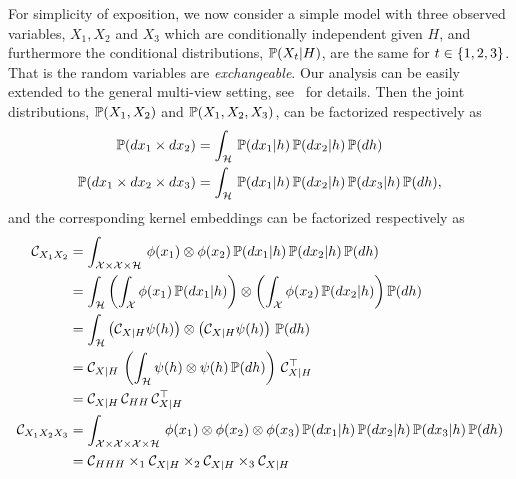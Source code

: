 \documentclass[11pt]{article}
\begin{document}
For simplicity of exposition, we now consider a simple model with three observed variables, $X_1, X_2$ and $X_3$ which are conditionally independent given $H$, and furthermore the conditional distributions, $\mathbb{P}(X_t|H)$, are the same for $t \in \left\{1,2,3\right\}$. That is the random variables are {\em exchangeable}. Our analysis can be easily extended to the general multi-view setting, see~\cite{AnandkumarEtal:tensor12} for details. Then the joint distributions, $\mathbb{P}(X_1,X_2)$ and $\mathbb{P}(X_1,X_2,X_3)$, can be factorized respectively as
\begin{align}
 \mathbb{P}(dx_1 \times dx_2) &= \int_{\mathcal{H}}\, \mathbb{P}(dx_1 | h )\, \mathbb{P}(d x_2 | h)\, \mathbb{P}(dh) \\
  \mathbb{P}(dx_1 \times dx_2\times dx_3) &= \int_{\mathcal{H}}\, \mathbb{P}(dx_1 | h )\, \mathbb{P}(dx_2 | h)\, \mathbb{P}(dx_3 | h)\, \mathbb{P}(dh),
\end{align}
and the corresponding kernel embeddings can be factorized respectively as
\begin{align}
  \mathcal{C}_{X_1X_2}
  &= \int_{\mathcal{X}\times \mathcal{X} \times \mathcal{H}}\, \phi(x_1) \otimes \phi(x_2)\, \mathbb{P}(dx_1 | h )\, \mathbb{P}(dx_2 | h)\, \mathbb{P}(dh) \\
  &= \int_{\mathcal{H}} \left(\int_{\mathcal{X}} \phi(x_1)\, \mathbb{P}(dx_1|h)\right) \otimes \left(\int_{\mathcal{X}} \phi(x_2)\, \mathbb{P}(dx_2 |h)\right) \mathbb{P}(dh) \\
  &= \int_{\mathcal{H}} \left(\mathcal{C}_{X|H} \psi(h)\right) \otimes \left(\mathcal{C}_{X|H} \psi(h)\right)\, \mathbb{P}(dh) \\
  &= \mathcal{C}_{X|H}\, \left(\int_{\mathcal{H}} \psi(h) \otimes \psi(h)\, \mathbb{P}(dh)\right)\, \mathcal{C}_{X|H}^\top\\
  &= \mathcal{C}_{X|H}\, \mathcal{C}_{HH}\, \mathcal{C}_{X|H}^\top \\
  \mathcal{C}_{X_1 X_2 X_3}
  &= \int_{\mathcal{X}\times \mathcal{X} \times \mathcal{X} \times \mathcal{H}}\, \phi(x_1) \otimes \phi(x_2) \otimes \phi(x_3) \, \mathbb{P}(dx_1 | h )\, \mathbb{P}(dx_2 | h)\, \mathbb{P}(dx_3 | h)\,  \mathbb{P}(dh) \\
  &= \mathcal{C}_{HHH} \times_1 \mathcal{C}_{X|H} \times_2 \mathcal{C}_{X|H} \times_3 \mathcal{C}_{X|H}
\end{align}
\end{document}
